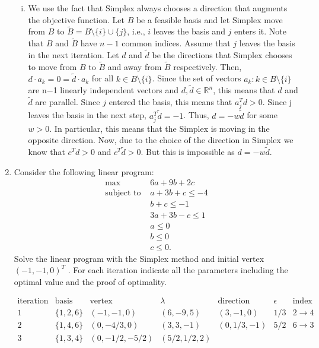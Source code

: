 \documentclass[11pt]{article}
\newcommand{\setR}{\mathbb{R}}
\begin{document}
\begin{enumerate}[1)]
\begin{solution}
\begin{enumerate}[i)]
  
  
  \item We use the fact that Simplex always chooses a direction that augments the objective function. Let $B$ be a feasible basis and let Simplex move from $B$ to
$\tilde{B}= B \setminus \{i\} \cup \{j\}$, i.e., $i$ leaves the basis and $j$ enters it. Note that $B$ and
$\tilde{B}$ have $n−1$ common indices. Assume that $j$ leaves the basis in the next iteration. Let $d$ and
$\tilde{d}$ be the directions that Simplex chooses to move from $B$ to $\tilde{B}$ and away from $\tilde{B}$ respectively. Then, $d\cdot a_k = 0 = \tilde{d}\cdot a_k$ for all $ k ∈B\setminus\{i\}$. Since the set of vectors $a_k : k ∈B\setminus\{i\}$ are n−1 linearly independent vectors and $d, \tilde{d} ∈\setR^n$, this means that $d$ and $\tilde{d}$ are parallel. Since $j$ entered the basis, this means that $a_j^T d>0$. Since j leaves the basis in the next step, $a^T_j \tilde{d}=−1$. Thus, $d= -w \tilde{d}$ for some $w >0$. In particular, this means that the Simplex is moving in the opposite direction. Now, due to the choice of the direction in Simplex we know that $c^Td>0$ and $c^T\tilde{d}>0$. But this is impossible as $d = -w \tilde{d}$. 
  \end{enumerate}
  
  \end{solution}
  
  
\item Consider the following linear program:
\begin{align*}
\max  \quad & 6a+ 9b+ 2c \\
\text{subject to } & a+ 3b+ c ≤−4 \\
&b+ c ≤−1 \\
& 3a+ 3b−c ≤1 \\
& a ≤0  \\
& b ≤0 \\
& c ≤0. 
\end{align*}
Solve the linear program with the Simplex method and initial vertex $(−1,−1,0)^T$ . For each iteration indicate all the parameters including the optimal value and the proof of optimality.

\begin{solution}
$$\begin{matrix}  \text{iteration} & \text{basis} & \text{vertex} & \lambda & \text{direction} & \epsilon & \text{index exchange} \\
1 & \{1, 2, 6\} & (-1, -1, 0) & (6, -9, 5) & (3, -1, 0) & 1/3 & 2\rightarrow 4 \\
2 & \{1, 4, 6\} & (0, -4/3, 0) & (3, 3, -1) & (0, 1/3, -1) & 5/2 & 6 \rightarrow 3 \\
3 & \{1, 3, 4\} & (0, -1/2, -5/2) & (5/2, 1/2, 2)  \end{matrix}$$


\end{solution}
\end{enumerate}
\end{document}

